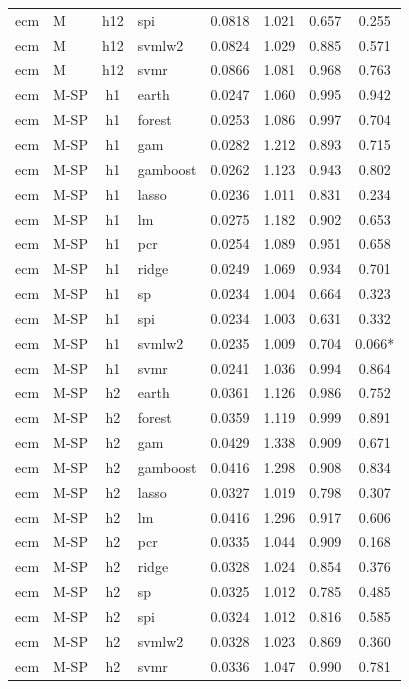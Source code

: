 \begin{ThreePartTable}
\begin{longtable}[t]{llclcccc}
ecm & M & h12 & spi & 0.0818 & 1.021 & 0.657 & 0.255\\
ecm & M & h12 & svmlw2 & 0.0824 & 1.029 & 0.885 & 0.571\\
ecm & M & h12 & svmr & 0.0866 & 1.081 & 0.968 & 0.763\\
\addlinespace
ecm & M-SP & h1 & earth & 0.0247 & 1.060 & 0.995 & 0.942\\
ecm & M-SP & h1 & forest & 0.0253 & 1.086 & 0.997 & 0.704\\
ecm & M-SP & h1 & gam & 0.0282 & 1.212 & 0.893 & 0.715\\
ecm & M-SP & h1 & gamboost & 0.0262 & 1.123 & 0.943 & 0.802\\
ecm & M-SP & h1 & lasso & 0.0236 & 1.011 & 0.831 & 0.234\\
ecm & M-SP & h1 & lm & 0.0275 & 1.182 & 0.902 & 0.653\\
ecm & M-SP & h1 & pcr & 0.0254 & 1.089 & 0.951 & 0.658\\
ecm & M-SP & h1 & ridge & 0.0249 & 1.069 & 0.934 & 0.701\\
ecm & M-SP & h1 & sp & 0.0234 & 1.004 & 0.664 & 0.323\\
ecm & M-SP & h1 & spi & 0.0234 & 1.003 & 0.631 & 0.332\\
ecm & M-SP & h1 & svmlw2 & 0.0235 & 1.009 & 0.704 & 0.066*\\
ecm & M-SP & h1 & svmr & 0.0241 & 1.036 & 0.994 & 0.864\\
\addlinespace
ecm & M-SP & h2 & earth & 0.0361 & 1.126 & 0.986 & 0.752\\
ecm & M-SP & h2 & forest & 0.0359 & 1.119 & 0.999 & 0.891\\
ecm & M-SP & h2 & gam & 0.0429 & 1.338 & 0.909 & 0.671\\
ecm & M-SP & h2 & gamboost & 0.0416 & 1.298 & 0.908 & 0.834\\
ecm & M-SP & h2 & lasso & 0.0327 & 1.019 & 0.798 & 0.307\\
ecm & M-SP & h2 & lm & 0.0416 & 1.296 & 0.917 & 0.606\\
ecm & M-SP & h2 & pcr & 0.0335 & 1.044 & 0.909 & 0.168\\
ecm & M-SP & h2 & ridge & 0.0328 & 1.024 & 0.854 & 0.376\\
ecm & M-SP & h2 & sp & 0.0325 & 1.012 & 0.785 & 0.485\\
ecm & M-SP & h2 & spi & 0.0324 & 1.012 & 0.816 & 0.585\\
ecm & M-SP & h2 & svmlw2 & 0.0328 & 1.023 & 0.869 & 0.360\\
ecm & M-SP & h2 & svmr & 0.0336 & 1.047 & 0.990 & 0.781\\

\end{longtable}
\end{ThreePartTable}
